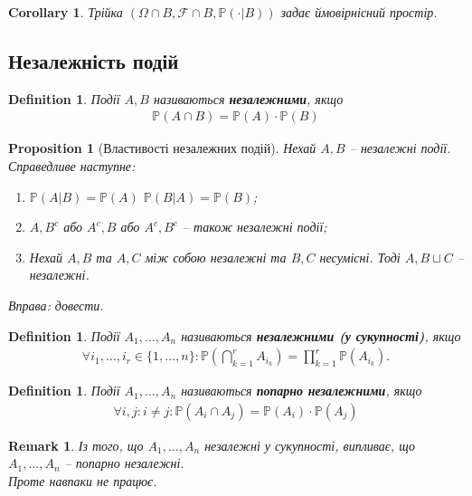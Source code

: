 \documentclass[a4paper, 10pt]{article}
\theoremstyle{theoremdd}
\newtheorem{definition}[theorem]{Definition}
\newtheorem{proposition}[theorem]{Proposition}
\newtheorem{remark}[theorem]{Remark}
\newtheorem{corollary}[theorem]{Corollary}
\begin{document}
\begin{corollary}
Трійка $(\Omega \cap B, \mathcal{F} \cap B, \mathbb{P}(\cdot | B))$ задає ймовірнісний простір.
\end{corollary}

\subsection{Незалежність подій}
\begin{definition}
Події $A,B$ називаються \textbf{незалежними}, якщо
\begin{align*}
\mathbb{P}(A \cap B) = \mathbb{P}(A) \cdot \mathbb{P}(B)
\end{align*}
\end{definition}

\begin{proposition}[Властивості незалежних подій]
Нехай $A,B$ -- незалежні події. Справедливе наступне:
\begin{enumerate}[nosep,wide=0pt,label={\arabic*)}]
\item $\mathbb{P}(A|B) = \mathbb{P}(A)$ \qquad $\mathbb{P}(B|A) = \mathbb{P}(B)$;
\item $A,B^c$ або $A^c,B$ або $A^c,B^c$ -- також незалежні події;
\item Нехай $A,B$ та $A,C$ між собою незалежні та $B,C$ несумісні. Тоді $A, B \sqcup C$ -- незалежні.
\end{enumerate}
\textit{Вправа: довести.}
\end{proposition}

\begin{definition}
Події $A_1,\dots,A_n$ називаються \textbf{незалежними (у сукупності)}, якщо
\begin{align*}
\forall i_1,\dots,i_r \in \{1,\dots,n\}: \mathbb{P}\left( \bigcap_{k=1}^r A_{i_k} \right) = \prod_{k=1}^r \mathbb{P}(A_{i_k}).
\end{align*}
\end{definition}

\begin{definition}
Події $A_1,\dots,A_n$ називаються \textbf{попарно незалежними}, якщо
\begin{align*}
\forall i,j: i \neq j: \mathbb{P}(A_i \cap A_j) = \mathbb{P}(A_i) \cdot \mathbb{P}(A_j)
\end{align*}
\end{definition}

\begin{remark}
Із того, що $A_1,\dots,A_n$ незалежні у сукупності, випливає, що $A_1,\dots,A_n$ -- попарно незалежні.\\
Проте навпаки не працює.
\end{remark}
\end{document}

